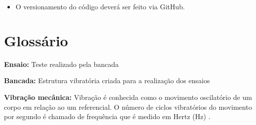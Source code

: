 \begin{apendicesenv}
\begin{itemize}
                \item O versionamento do código deverá ser feito via GitHub.
            \end{itemize}
    
\section*{Glossário}
    
    \textbf{Ensaio:} Teste realizado pela bancada 
 
    \textbf{Bancada:} Estrutura vibratória criada para a realização dos ensaios 
    
    \textbf{Vibração mecânica:} Vibração é conhecida como o movimento oscilatório de um corpo em relação ao um referencial. O número de ciclos vibratórios do movimento por segundo é chamado de frequência que é medido em Hertz (Hz) \cite{inman}.
    
    
\end{apendicesenv}
